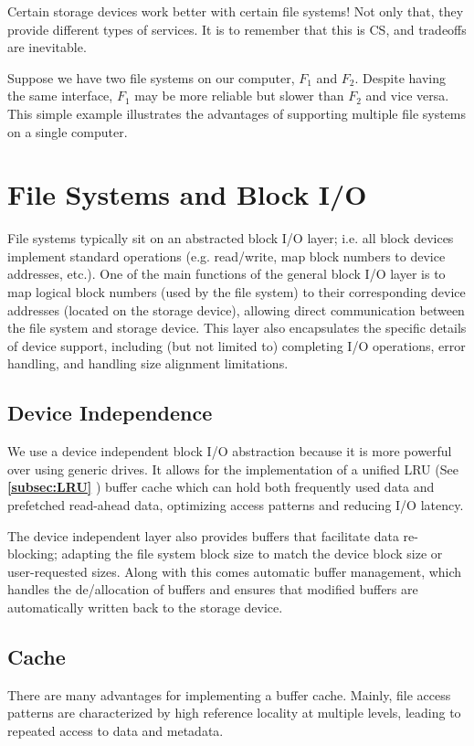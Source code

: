 \documentclass{report}
\newcommand{\exampleBegin}[1]{\begin{tcolorbox}[colback=blue!5!white,colframe=black!75!blue,title={Example:
      #1}]}
\newcommand{\exampleEnd}{\end{tcolorbox}}
\newcommand{\asideBegin}[1]{\begin{tcolorbox}[colback=orange!5!white,colframe=black!75!orange,title={Aside:
      #1}]}
\newcommand{\asideEnd}{\end{tcolorbox}}
\newcommand{\refto}[2]{\textbf{\ref{#1:#2} \nameref{#1:#2}}}
\begin{document}
\asideBegin{Why Multiple File Systems?}
Certain storage devices work better with certain file systems! Not only that, they provide different
types of services. It is to remember that this is CS, and tradeoffs are inevitable.

\exampleBegin{New File System New Services}
Suppose we have two file systems on our computer, $F_1$ and $F_2$. Despite having the same
interface, $F_1$ may be more reliable but slower than $F_2$ and vice versa. This simple example
illustrates the advantages of supporting multiple file systems on a single computer.
\exampleEnd
\asideEnd


\section{File Systems and Block I/O}
File systems typically sit on an abstracted block I/O layer; i.e. all block devices implement
standard operations (e.g. read/write, map block numbers to device addresses, etc.). One of the main
functions of the general block I/O layer is to map logical block numbers (used by the file system)
to their corresponding device addresses (located on the storage device), allowing direct
communication between the file system and storage device. This layer also encapsulates the specific
details of device support, including (but not limited to) completing I/O operations, error handling,
and handling size alignment limitations.


\subsection{Device Independence}
We use a device independent block I/O abstraction because it is more powerful over using generic
drives. It allows for the implementation of a unified LRU (See \refto{subsec}{LRU}) buffer cache
which can hold both frequently used data and prefetched read-ahead data, optimizing access patterns
and reducing I/O latency.

The device independent layer also provides buffers that facilitate data re-blocking; adapting the
file system block size to match the device block size or user-requested sizes. Along with this comes
automatic buffer management, which handles the de/allocation of buffers and ensures that modified
buffers are automatically written back to the storage device.


\subsection{Cache}
There are many advantages for implementing a buffer cache. Mainly, file access patterns are characterized by
high reference locality at multiple levels, leading to repeated access to data and
metadata.
\end{document}

